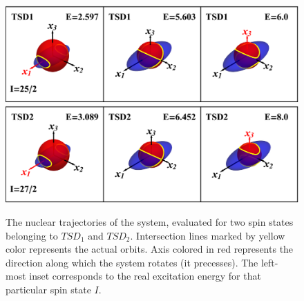 \documentclass[myclassdoc,debug]{rjparticle}
\begin{document}
\begin{figure}
    \centering
    \includegraphics[scale=0.7]{figs/tsd1_spin1.eps}
    \includegraphics[scale=0.7]{figs/tsd2_spin1.eps}
    \caption{The nuclear trajectories of the system, evaluated for two spin states belonging to $TSD_1$ and $TSD_2$. Intersection lines marked by yellow color represents the actual orbits. Axis colored in red represents the direction along which the system rotates (it precesses). The left-most inset corresponds to the real excitation energy for that particular spin state $I$.}
    \label{trajectories-12}
\end{figure}
\end{document}
